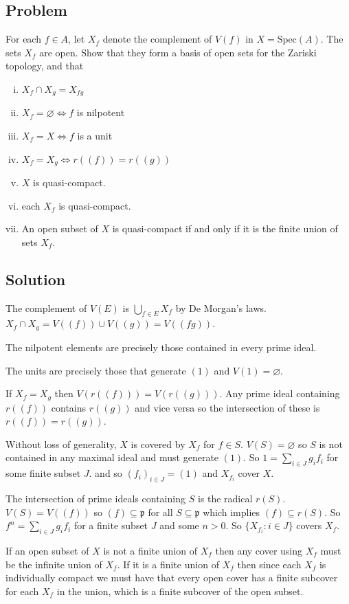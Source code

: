 \documentclass[book,12pt,oneside,openany]{memoir}
\begin{document}
\subsection{Problem}
For each $f\in A$, let $X_f$ denote the complement of $V(f)$ in
$X=\text{Spec}(A)$.
The sets $X_f$ are open.
Show that they form a basis of open sets for the Zariski topology,
and that
\begin{enumerate}[i)]
\item $X_f \cap X_g = X_{fg}$
\item $X_f=\varnothing \iff f$ is nilpotent
\item $X_f=X \iff f$ is a unit
\item $X_f=X_g\iff r((f))=r((g))$
\item $X$ is quasi-compact.
\item each $X_f$ is quasi-compact.
\item An open subset of $X$ is quasi-compact if and only if it is the
finite union of sets $X_f$.
\end{enumerate}
\subsection{Solution}
The complement of $V(E)$ is $\bigcup_{f\in E} X_f$ by De Morgan's laws.
$X_f \cap X_g = V((f)) \cup V((g)) = V((fg))$.

The nilpotent elements are precisely those contained in every prime ideal.

The units are precisely those that generate $(1)$ and $V(1)=\varnothing$.

If $X_f=X_g$ then $V(r((f)))=V(r((g)))$.
Any prime ideal containing $r((f))$ contains $r((g))$ and vice versa
so the intersection of these is $r((f))=r((g))$.

Without loss of generality, $X$ is covered by $X_{f}$ for $f\in S$.
$V(S)=\varnothing$ so $S$ is not contained in any maximal ideal and
must generate $(1)$.
So $1=\sum_{i\in J} g_i f_i$ for some finite subset $J$. and so
$(f_i)_{i\in J}=(1)$ and $X_{f_i}$ cover $X$.

The intersection of prime ideals containing $S$ is the radical $r(S)$.
$V(S)=V((f))$ so $(f)\subseteq \mathfrak p$ for all $S\subseteq \mathfrak p$
which implies $(f)\subseteq r(S)$.
So $f^n=\sum_{i\in J} g_i f_i$ for a finite subset $J$ and some $n>0$.
So $\{X_{f_i}:i\in J\}$ covers $X_f$.

If an open subset of $X$ is not a finite union of $X_f$ then any
cover using $X_f$ must be the infinite union of $X_f$.
If it is a finite union of $X_f$ then since each $X_f$ is individually
compact we must have that every open cover has a finite subcover
for each $X_f$ in the union, which is a finite subcover of the open
subset.
\end{document}
